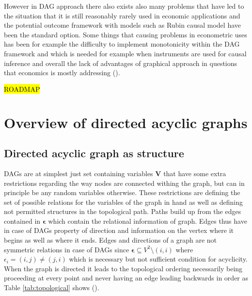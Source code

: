 \documentclass[main=english,12pt,a4paper,pdftex,econ,utf8]{aaltothesis}
\newcommand{\e}{\bm{\epsilon}}
\newcommand{\vars}{\bm{V}}
\begin{document}
However in DAG approach there also exists also many problems that have led to the situation that it is still reasonably rarely used in economic applications and the potential outcome framework with models such as Rubin causal model have been the standard option. Some things that causing problems in econometric uses has been for example the difficulty to implement monotonicity within the DAG framework and which is needed for example when instruments are used for causal inference and overall the lack of advantages of graphical approach in questions that economics is mostly addressing (\cite{Imbens2014}).

\noindent \hl{ROADMAP}

\clearpage

\section{Overview of directed acyclic graphs}

\subsection{Directed acyclic graph as structure}

DAGs are at simplest just set containing variables $\vars$ that have some extra restrictions regarding the way nodes are connected withing the graph, but can in principle be any random variables otherwise. These restrictions are defining the set of possible relations for the variables of the graph in hand as well as defining not permitted structures in the topological path. Paths build up from the edges contained in $\e$ which contain the relational information of graph. Edges thus have in case of DAGs property of direction and information on the vertex where it begins as well as where it ends. Edges and directions of a graph are not symmetric relations in case of DAGs since $\e\subseteq V^2\setminus(i,i)$ where $\epsilon_i=(i,j)\neq(j,i)$ which is necessary but not sufficient condition for acyclicity. When the graph is directed it leads to the topological ordering necessarily being proceeding at every point and never having an edge leading backwards in order as Table \ref{tab:topological} shows (\cite{Peters2017}).


\end{document}
